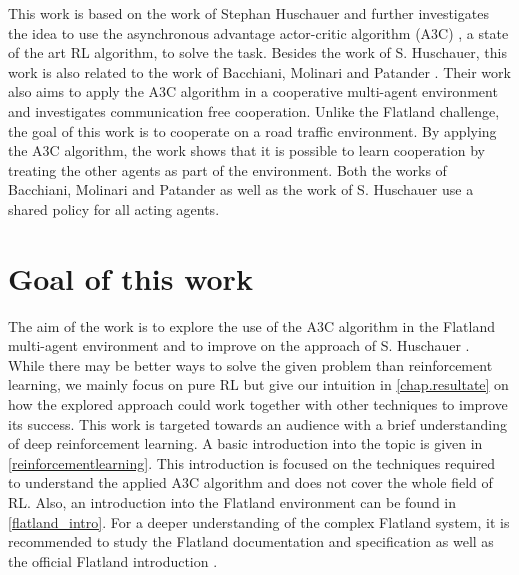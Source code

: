 This work is based on the work of Stephan Huschauer \cite{flatlandstephan} and further investigates the idea to use the asynchronous advantage actor-critic algorithm (A3C) \cite{a3c}, a state of the art RL algorithm, to solve the task.
Besides the work of S. Huschauer, this work is also related to the work of Bacchiani, Molinari and Patander \cite{marltraffica3c}. Their work also aims to apply the A3C algorithm in a cooperative multi-agent environment and investigates communication free cooperation.
Unlike the Flatland challenge, the goal of this work is to cooperate on a road traffic environment. By applying the A3C algorithm, the work shows that it is possible to learn cooperation by treating the other agents as part of the environment. Both the works of Bacchiani, Molinari and Patander as well as the work of S. Huschauer use a shared policy for all acting agents.

\section{Goal of this work}\label{zielsetzung}
The aim of the work is to explore the use of the A3C algorithm in the Flatland multi-agent environment and to improve on the approach of S. Huschauer \cite{flatlandstephan}.\\
While there may be better ways to solve the given problem than reinforcement learning, we mainly focus on pure RL but give our intuition in \autoref{chap.resultate} on how the explored approach could work together with other techniques to improve its success.
This work is targeted towards an audience with a brief understanding of deep reinforcement learning. A basic introduction into the topic is given in \autoref{reinforcementlearning}. This introduction is focused on the techniques required to understand the applied A3C algorithm and does not cover the whole field of RL.
Also, an introduction into the Flatland environment can be found in \autoref{flatland_intro}. For a deeper understanding of the complex Flatland system, it is recommended to study the Flatland documentation and specification \cite{flatland_docu} as well as the official Flatland introduction \cite{aicrowd}.

